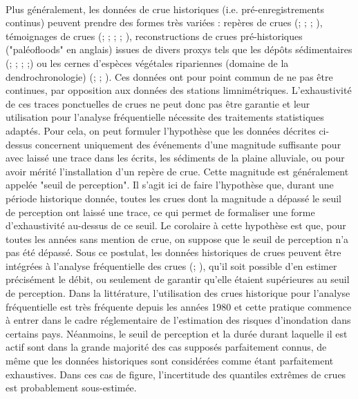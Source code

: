 \documentclass[11pt]{article}
\begin{document}
	\paragraph{} Plus généralement, les données de crue historiques (i.e. pré-enregistrements continus) peuvent prendre des formes très variées : repères de crues (\citet{parkes_defining_2016}; \citet{piotte_collection_2016}; \citet{engeland_new_2020}; \citet{medd_reperes_nodate}), témoignages de crues (\citet{pichard_les_1995}; \citet{naulet_flood_2005}; \citet{neppel_flood_2010}; \citet{kjeldsen_documentary_2014}; \citet{macdonald_reassessing_2014}), reconstructions de crues pré-historiques ("paléofloods" en anglais) issues de divers proxys tels que les dépôts sédimentaires (\citet{baker_paleoflood_1987}; \citet{dezileau_multidating_2014}; \citet{engeland_new_2020}; \citet{corella_1400-years_2021};\citet{wilhelm_reconstructing_2022}) ou les cernes d'espèces végétales ripariennes (domaine de la dendrochronologie) (\citet{martens_dendrochronological_1992}; \citet{loomans_flood_1993}; \citet{ballesteros-canovas_review_2015}). Ces données ont pour point commun de ne pas être continues, par opposition aux données des stations limnimétriques. L'exhaustivité de ces traces ponctuelles de crues ne peut donc pas être garantie et leur utilisation pour l'analyse fréquentielle nécessite des traitements statistiques adaptés. Pour cela, on peut formuler l'hypothèse que les données décrites ci-dessus concernent uniquement des événements d'une magnitude suffisante pour avec laissé une trace dans les écrits, les sédiments de la plaine alluviale, ou pour avoir mérité l'installation d'un repère de crue. Cette magnitude est généralement appelée "seuil de perception". Il s'agit ici de faire l'hypothèse que, durant une période historique donnée, toutes les crues dont la magnitude a dépassé le seuil de perception ont laissé une trace, ce qui permet de formaliser une forme d'exhaustivité au-dessus de ce seuil. Le corolaire à cette hypothèse est que, pour toutes les années sans mention de crue, on suppose que le seuil de perception n'a pas été dépassé. Sous ce postulat, les données historiques de crues peuvent être intégrées à l'analyse fréquentielle des crues (\citet{gerard_probability_1979}; \citet{stedinger_flood_1986}), qu'il soit possible d'en estimer précisément le débit, ou seulement de garantir qu'elle étaient supérieures au seuil de perception. Dans la littérature, l'utilisation des crues historique pour l'analyse fréquentielle est très fréquente depuis les années 1980 et cette pratique commence à entrer dans le cadre réglementaire de l'estimation des risques d'inondation dans certains pays. Néanmoins, le seuil de perception et la durée durant laquelle il est actif sont dans la grande majorité des cas supposés parfaitement connus, de même que les données historiques sont considérées comme étant parfaitement exhaustives. Dans ces cas de figure, l'incertitude  des quantiles extrêmes de crues est probablement sous-estimée. 
\end{document}
